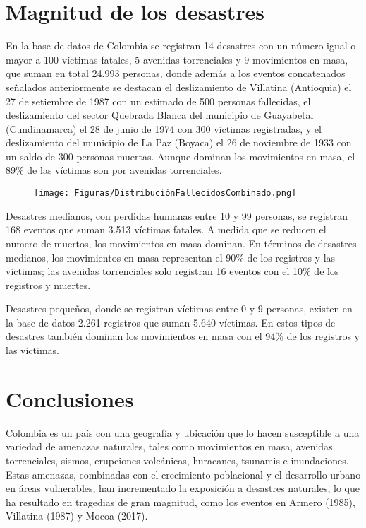 \documentclass{article}
\begin{document}
\section{Magnitud de los desastres}
En la base de datos de Colombia se registran 14 desastres con un número igual o mayor a 100 víctimas fatales, 5 avenidas torrenciales y 9 movimientos en masa, que suman en total 24.993 personas,  donde además a los eventos concatenados señalados anteriormente se destacan el deslizamiento de Villatina (Antioquia) el 27 de setiembre de 1987 con un estimado de 500 personas fallecidas,  el deslizamiento del sector Quebrada Blanca del municipio de Guayabetal (Cundinamarca) el 28 de junio de 1974 con 300 víctimas registradas, y el deslizamiento del municipio de La Paz (Boyaca) el 26 de noviembre de 1933 con un saldo de 300 personas muertas. Aunque dominan los movimientos en masa, el 89\% de las víctimas son por avenidas torrenciales. 

\begin{figure}[ht!]
    \centering
      {\texttt{[image: Figuras/DistribuciónFallecidosCombinado.png]}}
    \caption{}
    \label{fig:des}
\end{figure}

Desastres medianos, con perdidas humanas entre 10 y 99 personas, se registran 168 eventos que suman 3.513 víctimas fatales. A medida que se reducen el numero de muertos, los movimientos en masa dominan. En términos de desastres medianos, los movimientos en masa representan el 90\% de los registros y las víctimas; las avenidas torrenciales solo registran 16 eventos con el 10\% de los registros y muertes.

Desastres pequeños, donde se registran víctimas entre 0 y 9 personas, existen en la base de datos 2.261 registros que suman 5.640 víctimas. En estos tipos de desastres también dominan los movimientos en masa con el 94\% de los registros y las víctimas.

\section{Conclusiones}

Colombia es un país con una geografía y ubicación que lo hacen susceptible a una variedad de amenazas naturales, tales como movimientos en masa, avenidas torrenciales, sismos, erupciones volcánicas, huracanes, tsunamis e inundaciones. Estas amenazas, combinadas con el crecimiento poblacional y el desarrollo urbano en áreas vulnerables, han incrementado la exposición a desastres naturales, lo que ha resultado en tragedias de gran magnitud, como los eventos en Armero (1985), Villatina (1987) y Mocoa (2017).
\end{document}
